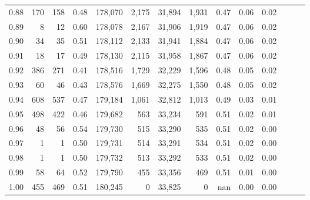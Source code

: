 \begin{tabular}{rrrrrrrrrrrrrr}
0.88 &     170 &    158 &  0.48 &  178,070 &    2,175 &  31,894 &   1,931 &  0.47 &  0.06 &      0.02 \\
0.89 &       8 &     12 &  0.60 &  178,078 &    2,167 &  31,906 &   1,919 &  0.47 &  0.06 &      0.02 \\
0.90 &      34 &     35 &  0.51 &  178,112 &    2,133 &  31,941 &   1,884 &  0.47 &  0.06 &      0.02 \\
0.91 &      18 &     17 &  0.49 &  178,130 &    2,115 &  31,958 &   1,867 &  0.47 &  0.06 &      0.02 \\
0.92 &     386 &    271 &  0.41 &  178,516 &    1,729 &  32,229 &   1,596 &  0.48 &  0.05 &      0.02 \\
0.93 &      60 &     46 &  0.43 &  178,576 &    1,669 &  32,275 &   1,550 &  0.48 &  0.05 &      0.02 \\
0.94 &     608 &    537 &  0.47 &  179,184 &    1,061 &  32,812 &   1,013 &  0.49 &  0.03 &      0.01 \\
0.95 &     498 &    422 &  0.46 &  179,682 &      563 &  33,234 &     591 &  0.51 &  0.02 &      0.01 \\
0.96 &      48 &     56 &  0.54 &  179,730 &      515 &  33,290 &     535 &  0.51 &  0.02 &      0.00 \\
0.97 &       1 &      1 &  0.50 &  179,731 &      514 &  33,291 &     534 &  0.51 &  0.02 &      0.00 \\
0.98 &       1 &      1 &  0.50 &  179,732 &      513 &  33,292 &     533 &  0.51 &  0.02 &      0.00 \\
0.99 &      58 &     64 &  0.52 &  179,790 &      455 &  33,356 &     469 &  0.51 &  0.01 &      0.00 \\
1.00 &     455 &    469 &  0.51 &  180,245 &        0 &  33,825 &       0 &   nan &  0.00 &      0.00 \\
\bottomrule
\end{tabular}
